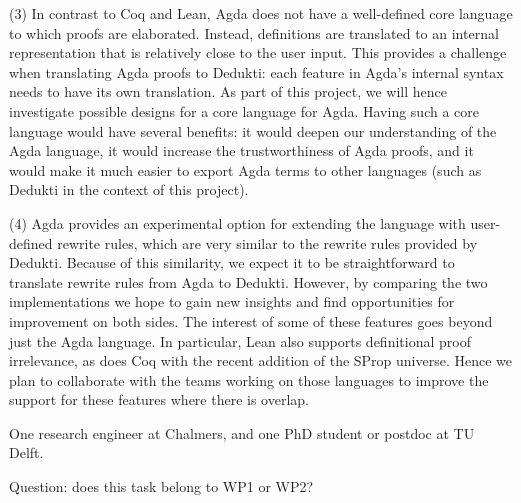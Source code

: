 (3) In contrast to Coq and Lean, Agda does not have a well-defined
core language to which proofs are elaborated. Instead, definitions are
translated to an internal representation that is relatively close to
the user input. This provides a challenge when translating Agda proofs
to Dedukti: each feature in Agda’s internal syntax needs to have its
own translation. As part of this project, we will hence investigate
possible designs for a core language for Agda. Having such a core
language would have several benefits: it would deepen our
understanding of the Agda language, it would increase the
trustworthiness of Agda proofs, and it would make it much easier to
export Agda terms to other languages (such as Dedukti in the context
of this project).

(4) Agda provides an experimental option for extending the language
with user-defined rewrite rules, which are very similar to the rewrite
rules provided by Dedukti. Because of this similarity, we expect it to
be straightforward to translate rewrite rules from Agda to
Dedukti. However, by comparing the two implementations we hope to gain
new insights and find opportunities for improvement on both sides. The
interest of some of these features goes beyond just the Agda
language. In particular, Lean also supports definitional proof
irrelevance, as does Coq with the recent addition of the SProp
universe. Hence we plan to collaborate with the teams working on those
languages to improve the support for these features where there is
overlap.

One research engineer at Chalmers, and one PhD student or postdoc at TU Delft.

Question: does this task belong to WP1 or WP2?

